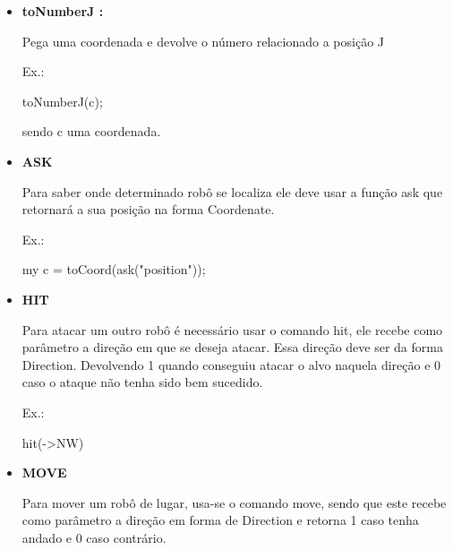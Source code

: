 \documentclass[a4paper]{article}
\begin{document}
{{{{{{{{\begin{itemize}
            toNumberI(c);
            
            sendo c uma coordenada.
            
        \bigskip
        
        \item \textbf{toNumberJ :}
            
            Pega uma coordenada e devolve o número relacionado
            a posição J
            
            \textcolor{NavyBlue}{Ex.:}
            
            toNumberJ(c);
            
            sendo c uma coordenada.
            
       
       
\newpage %
        
         
        \item \textbf{ASK}
        
            Para saber onde determinado robô se localiza
            ele deve usar a função 
            \textcolor{NavyBlue}{ask} 
            que retornará a sua posição na forma
            Coordenate.
        
            \textcolor{NavyBlue}{Ex.:}
        
            my c = toCoord(ask("position"));
        
        \bigskip
        
        \item \textbf{HIT}
            
            Para atacar um outro robô é necessário 
            usar o comando
            \textcolor{NavyBlue}{hit},
            ele recebe como parâmetro a direção em
            que se deseja atacar. 
            Essa direção deve ser da forma Direction.
            Devolvendo 1 quando conseguiu atacar o
            alvo naquela direção e 0 caso o ataque
            não tenha sido bem sucedido.
            
            \textcolor{NavyBlue}{Ex.:}
            
            hit(->NW)

        \bigskip
        
        \item \textbf{MOVE}
            
            Para mover um robô de lugar, usa-se o comando
            \textcolor{NavyBlue}{move},
            sendo que este recebe como parâmetro a direção
            em forma de Direction e retorna 1 caso
            tenha andado e 0 caso contrário.
                

\end{itemize}}}}}}}}}
\end{document}
